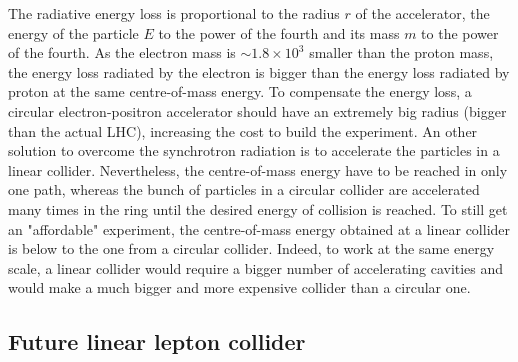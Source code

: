     The radiative energy loss is proportional to the radius $r$ of the accelerator, the energy of the particle $E$ to the power of the fourth and its mass $m$ to the power of the fourth.
    As the electron mass is $\sim 1.8 \times 10^3$ smaller than the proton mass, the energy loss radiated by the electron is bigger than the energy loss radiated by proton at the same centre-of-mass energy.
    To compensate the energy loss, a circular electron-positron accelerator should have an extremely big radius (bigger than the actual \gls{LHC}), increasing the cost to build the experiment.
    An other solution to overcome the synchrotron radiation is to accelerate the particles in a linear collider. Nevertheless, the centre-of-mass energy have to be reached in only one path, whereas the bunch of particles in a circular collider are accelerated many times in the ring until the desired energy of collision is reached.
    To still get an "affordable" experiment, the centre-of-mass energy obtained at a linear collider is below to the one from a circular collider. 
    Indeed, to work at the same energy scale, a linear collider would require a bigger number of accelerating cavities and would make a much bigger and more expensive collider than a circular one.

    \subsection{Future linear lepton collider}

